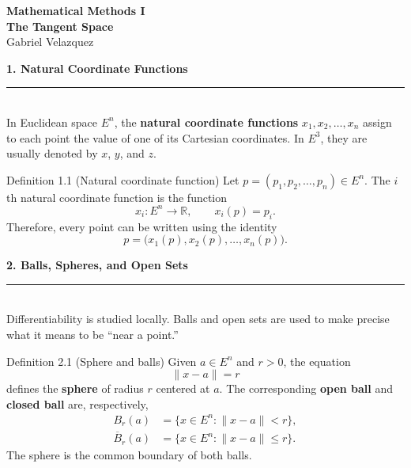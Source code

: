 \documentclass[11pt,letterpaper]{article}
\newcommand{\manualsection}[1]{%
  \Needspace{12\baselineskip}%
  \vspace{0.35cm}
  {\Large\bfseries\color{blackmain} #1}\\[2pt]
  {\color{orangeacc}\rule{\linewidth}{1.4pt}}\\[0.25cm]
}
\newcommand{\term}[1]{\textbf{\color{orangeacc}#1}}
\begin{document}
\color{blackmain}

\begin{center}
  {\LARGE\textbf{\color{blackmain}Mathematical Methods I}}\\[0.2cm]
  {\Large\textcolor{orangeacc}{\textbf{The Tangent Space}}}\\[0.4cm]
  {\large\textcolor{graymuted}{Gabriel Velazquez}}\\[0.6cm]
\end{center}

\manualsection{1. Natural Coordinate Functions}

In Euclidean space $E^n$, the \term{natural coordinate functions}
$x_1,x_2,\ldots,x_n$ assign to each point the value of one of its Cartesian
coordinates. In $E^3$, they are usually denoted by $x$, $y$, and $z$.

\begin{infobox}[orangeacc]{Definition 1.1 (Natural coordinate function)}
Let $p=(p_1,p_2,\ldots,p_n)\in E^n$. The $i$th natural coordinate function is
the function
\begin{equation}
  x_i:E^n\longrightarrow\mathbb{R},
  \qquad x_i(p)=p_i.
\end{equation}
Therefore, every point can be written using the identity
\begin{equation}
  p=\bigl(x_1(p),x_2(p),\ldots,x_n(p)\bigr).
\end{equation}
\end{infobox}

\manualsection{2. Balls, Spheres, and Open Sets}

Differentiability is studied locally. Balls and open sets are used to make precise
what it means to be ``near a point.''

\begin{infobox}[blackmain]{Definition 2.1 (Sphere and balls)}
Given $a\in E^n$ and $r>0$, the equation
\begin{equation}
  \|x-a\|=r
\end{equation}
defines the \term{sphere} of radius $r$ centered at $a$. The corresponding
\term{open ball} and \term{closed ball} are, respectively,
\begin{align}
  B_r(a)&=\{x\in E^n:\|x-a\|<r\},\\
  \overline B_r(a)&=\{x\in E^n:\|x-a\|\le r\}.
\end{align}
The sphere is the common boundary of both balls.
\end{infobox}
\end{document}
